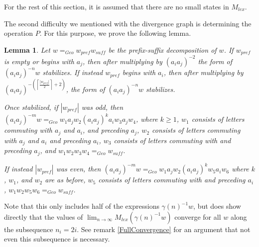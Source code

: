 \documentclass[10pt,a4paper]{amsart}
\newtheorem{lemma}[theorem]{Lemma}
\theoremstyle{definition}
\theoremstyle{remark}
\begin{document}
	For the rest of this section, it is assumed that there are no small states in $M_{lex}$.
	
	The second difficulty we mentioned with the divergence graph is determining the operation $P$. For this purpose, we prove the following lemma.
	
	\begin{lemma}
		
		Let $w=_{Geo}w_{pref}w_{suff}$ be the prefix-suffix decomposition of $w$. If $w_{pref}$ is empty or begins with $a_j$, then after multiplying by $(a_ia_j)^{-2}$ the form of $(a_ia_j)^{-n}w$ stabilizes. If instead $w_{pref}$ begins with $a_i$, then after multiplying by $(a_ia_j)^{-\left(\left\lceil\frac{|w_{pref}|}{2}\right\rceil+2\right)}$, the form of $(a_ia_j)^{-n}w$ stabilizes.
		
		Once stabilized, if $|w_{pref}|$ was odd, then $(a_ia_j)^{-m}w=_{Geo} w_1a_jw_2(a_ia_j)^ka_iw_3a_jw_4$, where $k\ge 1$, $w_1$ consists of letters commuting with $a_j$ and $a_i$, and preceding $a_j$, $w_2$ consists of letters commuting with $a_j$ and $a_i$ and preceding $a_i$, $w_3$ consists of letters commuting with and preceding $a_j$, and $w_1w_2w_3w_4=_{Geo}w_{suff}$.
		
		If instead $|w_{pref}|$ was even, then $(a_ia_j)^{-m}w=_{Geo} w_1a_jw_2(a_ia_j)^kw_5a_iw_6$ where $k$, $w_1$, and $w_2$ are as before, $w_5$ consists of letters commuting with and preceding $a_i$, \newline $w_1w_2w_5w_6=_{Geo}w_{suff}$.
		
	\end{lemma}
	
	Note that this only includes half of the expressions $\gamma(n)^{-1}w$, but does show directly that the values of $\lim_{n\to \infty} M_{lex}(\gamma(n)^{-1}w)$ converge for all $w$ along the subsequence $n_i=2i$. See remark \ref{FullConvergence} for an argument that not even this subsequence is necessary.
	
\end{document}
